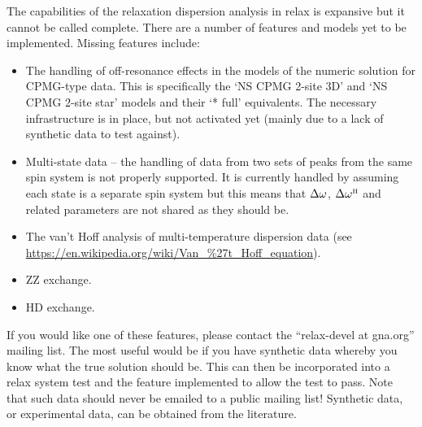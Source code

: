 The capabilities of the relaxation dispersion analysis in relax is expansive but it cannot be called complete.
There are a number of features and models yet to be implemented.
Missing features include:
\begin{itemize}
\item The handling of off-resonance effects in the models of the numeric solution for CPMG-type data.
This is specifically the `NS CPMG 2-site 3D' and `NS CPMG 2-site star' models and their `* full' equivalents.
The necessary infrastructure is in place, but not activated yet (mainly due to a lack of synthetic data to test against).
\item Multi-state data -- the handling of data from two sets of peaks from the same spin system is not properly supported.
It is currently handled by assuming each state is a separate spin system but this means that $\Delta\omega$, $\Delta\omega^{\scriptscriptstyle\mathrm{H}}$ and related parameters are not shared as they should be.
\item The van't Hoff analysis of multi-temperature dispersion data (see \url{https://en.wikipedia.org/wiki/Van\_\%27t\_Hoff\_equation}).
\item ZZ exchange.
\item HD exchange.
\end{itemize}

If you would like one of these features, please contact the ``relax-devel at gna.org'' mailing list.
The most useful would be if you have synthetic data whereby you know what the true solution should be.
This can then be incorporated into a relax system test and the feature implemented to allow the test to pass.
Note that such data should never be emailed to a public mailing list!
Synthetic data, or experimental data, can be obtained from the literature.

